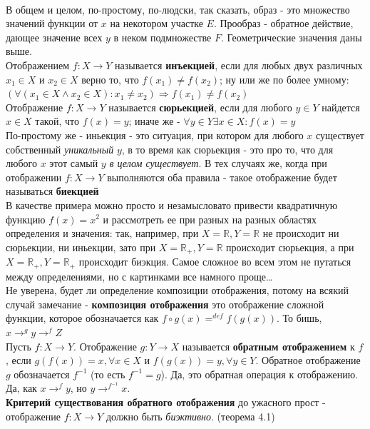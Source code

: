 \documentclass[10pt, a4paper,twocolumn]{article}
\begin{document}
\\В общем и целом, по-простому, по-людски, так сказать, образ - это множество значений функции от $x$ на некотором участке $E$. Прообраз - обратное действие, дающее значение всех $y$ в неком подмножестве $F$. Геометрические значения даны выше.
\\Отображением $f : X \to Y$ называется \textbf{инъекцией}, если для любых двух различных $x_{1} \in X$ и $x_{2} \in X$ верно то, что $f(x_{1}) \neq f(x_{2})$;  ну или же по более умному: $(\forall (x_{1} \in X \wedge x_{2} \in X) : x_{1} \neq x_{2}) \Rightarrow f(x_{1}) \neq f(x_{2})$
\\Отображение $f : X \to Y$ называется \textbf{сюрьекцией}, если для любого $y \in Y$ найдется $x \in X$ такой, что $f(x) = y$; иначе же - $\forall y \in Y \exists x \in X : f(x) = y$
\\По-простому же - иньекция - это ситуация, при котором для любого $x$ существует собственный \textsl{уникальный} $y$, в то время как сюрьекция - это про то, что для любого $x$ этот самый $y$ \textsl{в целом существует}. В тех случаях же, когда при отображении $f : X \to Y$ выполняются оба правила - такое отображение будет называться \textbf{биекцией}
\\В качестве примера можно просто и незамысловато привести квадратичную функцию $f(x) = x^{2}$ и рассмотреть ее при разных на разных областях определения и значения: так, например, при $X = \mathbb{R}, Y = \mathbb{R}$ не происходит ни сюрьекции, ни иньекции, зато при $X = \mathbb{R}_{+}, Y = \mathbb{R}$ происходит сюрьекция, а при $X = \mathbb{R}_{+}, Y = \mathbb{R}_{+}$ происходит биэкция. Самое сложное во всем этом не путаться между определениями, но с картинками все намного проще\dots
\\Не уверена, будет ли определение композиции отображения, потому на всякий случай замечание - \textbf{композиция отображения} это отображение сложной функции, которое обозначается как $f \circ g(x) =^{def} f(g(x))$. То бишь, $x \rightarrow^{g} y \rightarrow^{f} Z$
\\Пусть $f : X \rightarrow Y$. Отображение $g : Y \rightarrow X$ называется \textbf{обратным отображением} к $f$, если $g(f(x)) = x, \forall x \in X$ и $f(g(x)) = y, \forall y \in Y$. Обратное отображение $g$ обозначается $f^{-1}$ (то есть $f^{-1} = g$). Да, это обратная операция к отображению. Да, как $x \rightarrow^{f} y$, но $y \rightarrow^{f^{-1}} x$. 
\\\textbf{Критерий существования обратного отображения} до ужасного прост - отображение $f : X \rightarrow Y$ должно быть \textsl{биэктивно}. (теорема 4.1)
\end{document}
